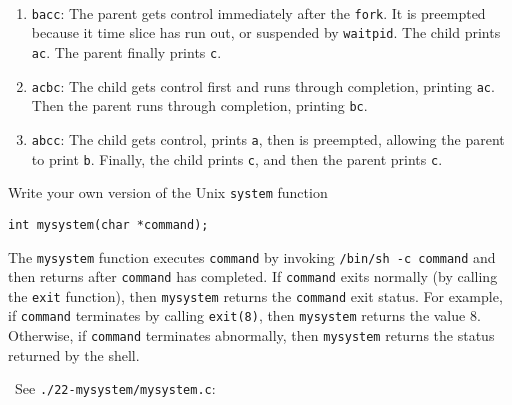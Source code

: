 \documentclass[12pt]{article}
\newenvironment{ex}[2][Exercise]{\begin{trivlist}
		\item[\hskip \labelsep {\bfseries #1}\hskip \labelsep {\bfseries #2.}]}{\end{trivlist}}
\newenvironment{sol}[1][Solution]{\begin{trivlist}
		\item[\hskip \labelsep {\bfseries #1:}]}{\end{trivlist}}
\begin{document}
\begin{sol}
	\
	\begin{enumerate}
		\item \texttt{bacc}: The parent gets control immediately after the \texttt{fork}. It
		is preempted because it time slice has run out, or suspended by \texttt{waitpid}.
		The child prints \texttt{ac}. The parent finally prints \texttt{c}.
		\item \texttt{acbc}: The child gets control first and runs through completion, printing
		\texttt{ac}. Then the parent runs through completion, printing \texttt{bc}.
		\item \texttt{abcc}: The child gets control, prints \texttt{a}, then is preempted, allowing the
		parent to print \texttt{b}. Finally, the child prints \texttt{c}, and then the parent prints
		\texttt{c}.
	\end{enumerate}
\end{sol}

\begin{ex}{8.22}
	Write your own version of the Unix \texttt{system} function
	\begin{lstlisting}
int mysystem(char *command);
	\end{lstlisting}
	The \texttt{mysystem} function executes \texttt{command} by invoking \texttt{/bin/sh -c command}
	and then returns after \texttt{command} has completed. If \texttt{command} exits normally (by
	calling the \texttt{exit} function), then \texttt{mysystem} returns the \texttt{command} exit
	status. For example, if \texttt{command} terminates by calling \texttt{exit(8)}, then \texttt{mysystem}
	returns the value 8. Otherwise, if \texttt{command} terminates abnormally, then \texttt{mysystem}
	returns the status returned by the shell.
\end{ex}

\begin{sol}
	\
	See \texttt{./22-mysystem/mysystem.c}:
	
\end{sol}
\end{document}
